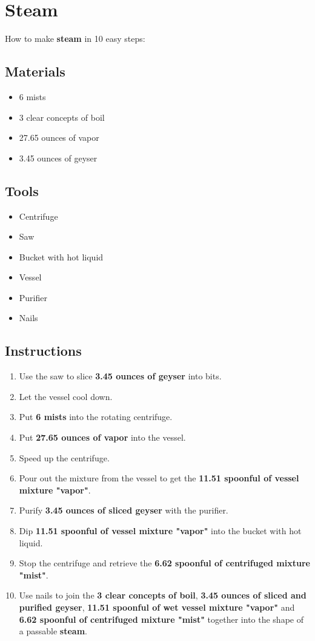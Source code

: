 \documentclass{article}
\begin{document}
\section{Steam}How to make \textbf{steam} in 10 easy steps:

\subsection{Materials}\begin{itemize}
\item 
6 mists
\item 
3 clear concepts of boil
\item 
27.65 ounces of vapor
\item 
3.45 ounces of geyser
\end{itemize}
\subsection{Tools}\begin{itemize}
\item 
Centrifuge
\item 
Saw
\item 
Bucket with hot liquid
\item 
Vessel
\item 
Purifier
\item 
Nails
\end{itemize}
\subsection{Instructions}\begin{enumerate}
\item 
Use the saw to slice \textbf{3.45 ounces of geyser} into bits.
\item 
Let the vessel cool down.
\item 
Put \textbf{6 mists} into the rotating centrifuge.
\item 
Put \textbf{27.65 ounces of vapor} into the vessel.
\item 
Speed up the centrifuge.
\item 
Pour out the mixture from the vessel to get the \textbf{11.51 spoonful of vessel mixture "vapor"}.
\item 
Purify \textbf{3.45 ounces of sliced geyser} with the purifier.
\item 
Dip \textbf{11.51 spoonful of vessel mixture "vapor"} into the bucket with hot liquid.
\item 
Stop the centrifuge and retrieve the \textbf{6.62 spoonful of centrifuged mixture "mist"}.
\item 
Use nails to join the \textbf{3 clear concepts of boil}, \textbf{3.45 ounces of sliced and purified geyser}, \textbf{11.51 spoonful of wet vessel mixture "vapor"} and \textbf{6.62 spoonful of centrifuged mixture "mist"} together into the shape of a passable \textbf{steam}.
\end{enumerate}
\newpage
\end{document}
